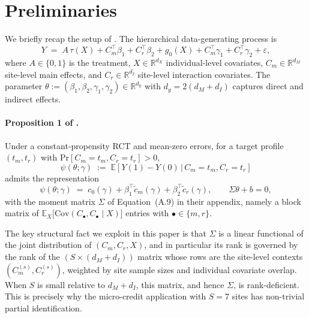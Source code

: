 \section{Preliminaries}
\label{sec:prelim}

We briefly recap the setup of \citet{boyarsky2026}. The hierarchical
data-generating process is
\begin{equation}
\label{eq:dgp}
Y \;=\; A\,\tau(X) + C_m^\top\beta_1 + C_r^\top\beta_2 + g_0(X)
 + C_m^\top\gamma_1 + C_r^\top\gamma_2 + \varepsilon,
\end{equation}
where $A\in\{0,1\}$ is the treatment, $X\in\mathbb{R}^{d_X}$ individual-level
covariates, $C_m\in\mathbb{R}^{d_M}$ site-level main effects, and
$C_r\in\mathbb{R}^{d_I}$ site-level interaction covariates. The parameter
$\theta := (\beta_1,\beta_2,\gamma_1,\gamma_2)\in\mathbb{R}^{d_g}$ with
$d_g = 2(d_M + d_I)$ captures direct and indirect effects.

\paragraph{Proposition 1 of \protect\citet{boyarsky2026}.}
Under a constant-propensity RCT and mean-zero errors, for a target profile
$(t_m,t_r)$ with $\mathrm{Pr}[C_m=t_m, C_r=t_r]>0$,
\[
\psi(\theta;\gamma) \;:=\; \mathbb{E}[Y(1)-Y(0)\,|\,C_m=t_m, C_r=t_r]
\]
admits the representation
\begin{equation}
\label{eq:rep}
\psi(\theta;\gamma)
 \;=\; c_0(\gamma) + \beta_1^\top \tilde c_m(\gamma) + \beta_2^\top \tilde c_r(\gamma),
\qquad
\Sigma\theta + b = 0,
\end{equation}
with the moment matrix $\Sigma$ of Equation~(A.9) in their appendix, namely a
block matrix of $\mathbb{E}_X\!\bigl[\mathrm{Cov}(C_\bullet,C_\bullet \mid X)\bigr]$
entries with $\bullet \in \{m, r\}$.

The key structural fact we exploit in this paper is that $\Sigma$ is a linear
functional of the joint distribution of $(C_m, C_r, X)$, and in particular its
rank is governed by the rank of the $(S \times (d_M + d_I))$ matrix whose rows
are the site-level contexts $(C_m^{(s)}, C_r^{(s)})$, weighted by site sample
sizes and individual covariate overlap. When $S$ is small relative to $d_M +
d_I$, this matrix, and hence $\Sigma$, is rank-deficient. This is precisely why
the \citet{meager2019understanding} micro-credit application with $S=7$ sites
has non-trivial partial identification.

